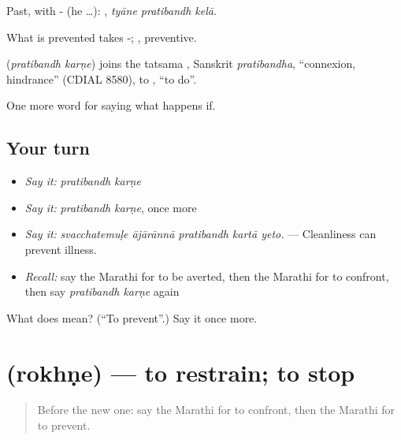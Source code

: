 Past, with - (he …):   , \emph{tyāne pratibandh kelā}.

What is prevented takes -; , preventive.

\begin{cousinweb}
\textbf{ } (\emph{pratibandh karṇe}) joins the tatsama , Sanskrit \emph{pratibandha}, \textquotedblleft{}connexion, hindrance\textquotedblright{} (CDIAL 8580), to , \textquotedblleft{}to do\textquotedblright{}.
\end{cousinweb}

\begin{grammarlens}[title={What you've built}]
One more word for saying what happens if.
\end{grammarlens}

\subsection*{Your turn}
\begin{itemize}
\raggedright
  \item \emph{Say it:} \emph{pratibandh karṇe}
  \item \emph{Say it:} \emph{pratibandh karṇe}, once more
  \item \emph{Say it:} \emph{svacchatemuḷe ājārānnā pratibandh kartā yeto.} — Cleanliness can prevent illness.
  \item \emph{Recall:} say the Marathi for to be averted, then the Marathi for to confront, then say \emph{pratibandh karṇe} again
\end{itemize}

\begin{tcolorbox}[breakable,colback=teal!4,colframe=teal!35!black,title={Before you move on}]
What does   mean? (\textquotedblleft{}To prevent\textquotedblright{}.) Say it once more.
\end{tcolorbox}
\section[\texorpdfstring{\mr{रोखणे} (rokhṇe)}{रोखणे (rokhṇe)}]{ (rokhṇe) — to restrain; to stop}

\label{lesson:MR-C386-rokhne}



\begin{quote}
Before the new one: say the Marathi for to confront, then the Marathi for to prevent.
\end{quote}

